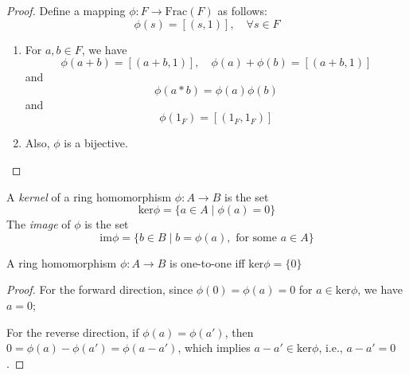 \begin{proof}
Define a mapping $\phi: F\to\mbox{Frac}(F)$ as follows:
\[
\phi(s)=[(s,1)],\quad \forall s\in F
\]
\begin{enumerate}
\item
For $a,b\in F$, we have
\[
\phi(a+b)=[(a+b,1)],\quad
\phi(a)+\phi(b)=[(a+b,1)]
\]
and
\[
\phi(a*b)=\phi(a)\phi(b)
\]
and
\[
\phi(1_F)=[(1_F,1_F)]
\]
\item
Also, $\phi$ is a bijective.
\end{enumerate}
\end{proof}
\begin{definition}[Kernel]
A \emph{kernel} of a ring homomorphism $\phi:A\to B$ is the set
\[
\mbox{ker}\phi=\{a\in A\mid\phi(a)=0\}
\]
The \emph{image} of $\phi$ is the set
\[
\mbox{im}\phi=\{b\in B\mid b=\phi(a),\mbox{ for some }a\in A\}
\]
\end{definition}
\begin{proposition}
A ring homomorphism $\phi:A\to B$ is one-to-one iff $\mbox{ker}\phi=\{0\}$
\end{proposition}
\begin{proof}
For the forward direction, since $\phi(0)=\phi(a)=0$ for $a\in\mbox{ker}\phi$, we have $a=0$;

For the reverse direction, if $\phi(a)=\phi(a')$, then $0=\phi(a)-\phi(a')=\phi(a-a')$, which implies $a-a'\in\mbox{ker}\phi$, i.e., $a-a'=0$.
\end{proof}

